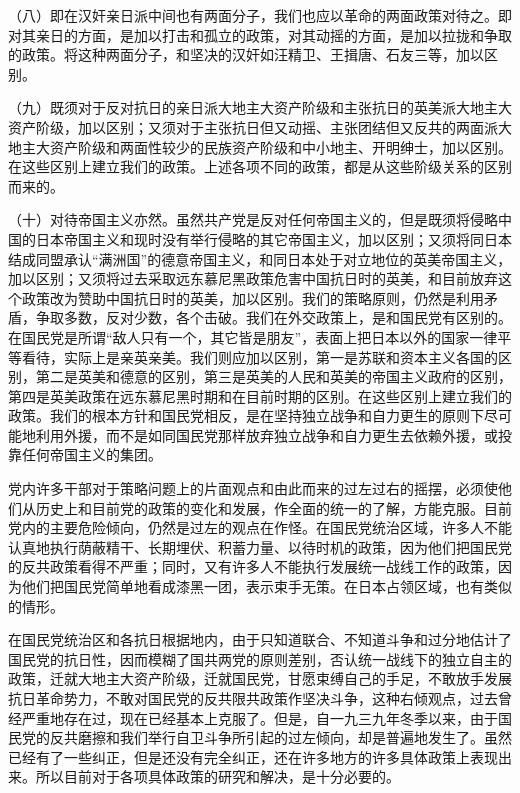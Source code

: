 （八）即在汉奸亲日派中间也有两面分子，我们也应以革命的两面政策对待之。即对其亲日的方面，是加以打击和孤立的政策，对其动摇的方面，是加以拉拢和争取的政策。将这种两面分子，和坚决的汉奸如汪精卫、王揖唐、石友三等，加以区别。

（九）既须对于反对抗日的亲日派大地主大资产阶级和主张抗日的英美派大地主大资产阶级，加以区别；又须对于主张抗日但又动摇、主张团结但又反共的两面派大地主大资产阶级和两面性较少的民族资产阶级和中小地主、开明绅士，加以区别。在这些区别上建立我们的政策。上述各项不同的政策，都是从这些阶级关系的区别而来的。

（十）对待帝国主义亦然。虽然共产党是反对任何帝国主义的，但是既须将侵略中国的日本帝国主义和现时没有举行侵略的其它帝国主义，加以区别；又须将同日本结成同盟承认“满洲国”的德意帝国主义，和同日本处于对立地位的英美帝国主义，加以区别；又须将过去采取远东慕尼黑政策危害中国抗日时的英美，和目前放弃这个政策改为赞助中国抗日时的英美，加以区别。我们的策略原则，仍然是利用矛盾，争取多数，反对少数，各个击破。我们在外交政策上，是和国民党有区别的。在国民党是所谓“敌人只有一个，其它皆是朋友”，表面上把日本以外的国家一律平等看待，实际上是亲英亲美。我们则应加以区别，第一是苏联和资本主义各国的区别，第二是英美和德意的区别，第三是英美的人民和英美的帝国主义政府的区别，第四是英美政策在远东慕尼黑时期和在目前时期的区别。在这些区别上建立我们的政策。我们的根本方针和国民党相反，是在坚持独立战争和自力更生的原则下尽可能地利用外援，而不是如同国民党那样放弃独立战争和自力更生去依赖外援，或投靠任何帝国主义的集团。

党内许多干部对于策略问题上的片面观点和由此而来的过左过右的摇摆，必须使他们从历史上和目前党的政策的变化和发展，作全面的统一的了解，方能克服。目前党内的主要危险倾向，仍然是过左的观点在作怪。在国民党统治区域，许多人不能认真地执行荫蔽精干、长期埋伏、积蓄力量、以待时机的政策，因为他们把国民党的反共政策看得不严重；同时，又有许多人不能执行发展统一战线工作的政策，因为他们把国民党简单地看成漆黑一团，表示束手无策。在日本占领区域，也有类似的情形。

在国民党统治区和各抗日根据地内，由于只知道联合、不知道斗争和过分地估计了国民党的抗日性，因而模糊了国共两党的原则差别，否认统一战线下的独立自主的政策，迁就大地主大资产阶级，迁就国民党，甘愿束缚自己的手足，不敢放手发展抗日革命势力，不敢对国民党的反共限共政策作坚决斗争，这种右倾观点，过去曾经严重地存在过，现在已经基本上克服了。但是，自一九三九年冬季以来，由于国民党的反共磨擦和我们举行自卫斗争所引起的过左倾向，却是普遍地发生了。虽然已经有了一些纠正，但是还没有完全纠正，还在许多地方的许多具体政策上表现出来。所以目前对于各项具体政策的研究和解决，是十分必要的。


